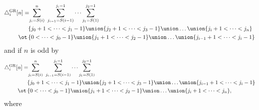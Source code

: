 %
%





\begin{align*}
\triangle^{\mathrm{GR}}_i [n] = \!
& \sum_{j_i=S(i)}^{n} \ \sum_{j_{i-1}=S(i-1)}^{j_i-1} \dots \sum_{j_1=S(1)}^{j_2-1} \\
& \{j_0+1 < \dots < j_1-1\} \union \{j_2+1 < \dots < j_3-1\} \union \dots \union \{j_i+1 < \dots < j_n\}\\ \ot \,
& \{0 < \dots < j_0-1\} \union \{j_1+1 < \dots < j_2-1\} \union \dots \union \{j_{i-1}+1 < \dots < j_i-1\}
\end{align*}
and if $n$ is odd by
\begin{align*}
\triangle^{\mathrm{GR}}_i [n] = \!
& \sum_{j_i=S(i)}^{n} \ \sum_{j_{i-1}=S(i-1)}^{j_i-1} \dots \sum_{j_1=S(1)}^{j_2-1} \\
& \{j_0+1 < \dots < j_1-1\} \union \{j_2+1 < \dots < j_3-1\} \union \dots \union \{j_{i-1}+1 < \dots < j_i-1\}\\ \ot \,
& \{0 < \dots < j_0-1\} \union \{j_1+1 < \dots < j_2-1\} \union \dots \union \{j_i+1 < \dots < j_n\},
\end{align*}
where



